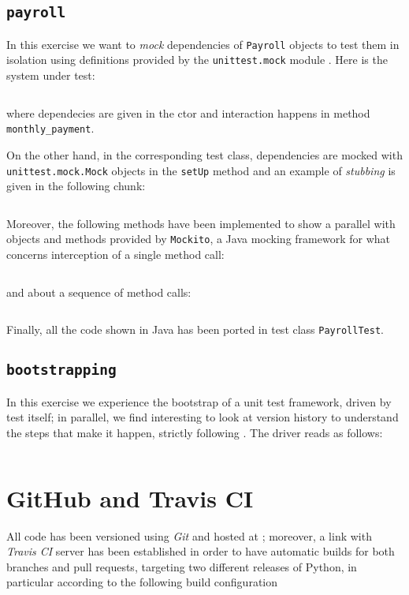 \documentclass[12pt]{article}
\begin{document}
\subsection{\texttt{payroll}}

In this exercise we want to \emph{mock} dependencies of
\texttt{Payroll} objects to test them in isolation using
definitions provided by the \texttt{unittest.mock} module \cite{unittest.mock}.
Here is the system under test: \inputminted[firstline=1,
lastline=19]{python}{../payroll/payroll.py} where dependecies are given in the
ctor and interaction happens in method \texttt{monthly_payment}.

On the other hand, in the corresponding test class, dependencies are mocked
with \texttt{unittest.mock.Mock} objects in the \texttt{setUp} method and an
example of \emph{stubbing} is given in the following chunk:
\inputminted[firstline=20, lastline=30]{python}{../payroll/payroll_test.py}
Moreover, the following methods have been implemented to show a parallel with
objects and methods provided by \texttt{Mockito}, a Java mocking framework for
what concerns interception of a single method call: \inputminted[firstline=42,
lastline=51]{python}{../payroll/payroll_test.py} and about a sequence of method
calls: \inputminted[firstline=63,
lastline=73]{python}{../payroll/payroll_test.py} Finally, all the code shown in
Java has been ported in test class \texttt{PayrollTest}.

\subsection{\texttt{bootstrapping}}
In this exercise we experience the bootstrap of a unit test framework, 
driven by test itself; in parallel, we find interesting to look at version
history to understand the steps that make it happen, strictly following
\cite{beck}. The driver reads as follows:
\inputminted{python}{../tdd/tdd_test.py}

\section{GitHub and Travis CI}

All code has been versioned using \emph{Git} and hosted at \cite{repo}; moreover,
a link with \emph{Travis CI} server \cite{travis} has been established in order to have
automatic builds for both branches and pull requests, targeting two 
different releases of Python, in particular according to the following build configuration
\inputminted{yaml}{../.travis.yml}
\end{document}

